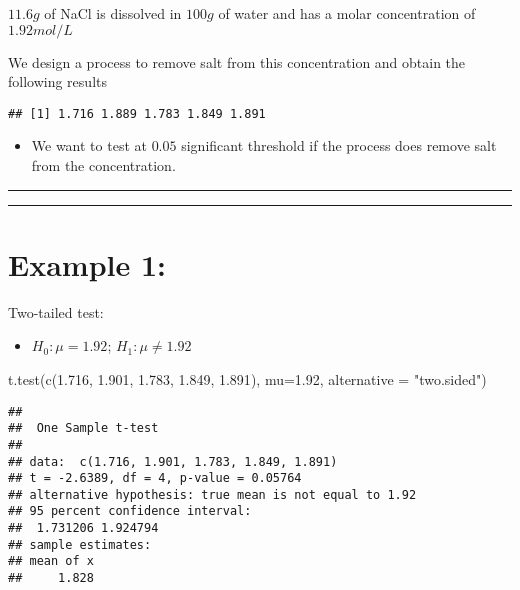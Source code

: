 \documentclass[
]{book}
\newenvironment{Shaded}{\begin{snugshade}}{\end{snugshade}}
\newcommand{\AttributeTok}[1]{\textcolor[rgb]{0.77,0.63,0.00}{#1}}
\newcommand{\FloatTok}[1]{\textcolor[rgb]{0.00,0.00,0.81}{#1}}
\newcommand{\FunctionTok}[1]{\textcolor[rgb]{0.00,0.00,0.00}{#1}}
\newcommand{\NormalTok}[1]{#1}
\newcommand{\StringTok}[1]{\textcolor[rgb]{0.31,0.60,0.02}{#1}}
\providecommand{\tightlist}{%
  \setlength{\itemsep}{0pt}\setlength{\parskip}{0pt}}
\begin{document}
\(11.6g\) of NaCl is dissolved in \(100 g\) of water and has a molar concentration of \(1.92 mol/L\)

We design a process to remove salt from this concentration and obtain the following results

\begin{verbatim}
## [1] 1.716 1.889 1.783 1.849 1.891
\end{verbatim}

\begin{itemize}
\tightlist
\item
  We want to test at \(0.05\) significant threshold if the process does remove salt from the concentration.
\end{itemize}

\begin{center}\rule{0.5\linewidth}{0.5pt}\end{center}

\begin{center}\rule{0.5\linewidth}{0.5pt}\end{center}

\hypertarget{example-1-5}{%
\section{Example 1:}\label{example-1-5}}

Two-tailed test:

\begin{itemize}
\tightlist
\item
  \(H_0:\mu=1.92\); \(H_1:\mu \neq 1.92\)
\end{itemize}

\begin{Shaded}
\begin{Highlighting}[]
\FunctionTok{t.test}\NormalTok{(}\FunctionTok{c}\NormalTok{(}\FloatTok{1.716}\NormalTok{, }\FloatTok{1.901}\NormalTok{, }\FloatTok{1.783}\NormalTok{, }\FloatTok{1.849}\NormalTok{, }\FloatTok{1.891}\NormalTok{), }
       \AttributeTok{mu=}\FloatTok{1.92}\NormalTok{, }\AttributeTok{alternative =} \StringTok{"two.sided"}\NormalTok{)}
\end{Highlighting}
\end{Shaded}

\begin{verbatim}
## 
##  One Sample t-test
## 
## data:  c(1.716, 1.901, 1.783, 1.849, 1.891)
## t = -2.6389, df = 4, p-value = 0.05764
## alternative hypothesis: true mean is not equal to 1.92
## 95 percent confidence interval:
##  1.731206 1.924794
## sample estimates:
## mean of x 
##     1.828
\end{verbatim}
\end{document}
